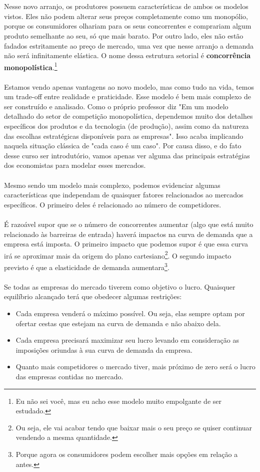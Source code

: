 \documentclass[a4paper,11pt,oneside]{book}
\theoremstyle{definition}
\theoremstyle{break}
\begin{document}
\\
\\
Nesse novo arranjo, os produtores possuem características de ambos os modelos vistos. Eles não podem alterar seus preços completamente como um monopólio, porque os consumidores olhariam para os seus concorrentes e comprariam algum produto semelhante ao seu, só que mais barato. Por outro lado, eles não estão fadados estritamente ao preço de mercado, uma vez que nesse arranjo a demanda não será infinitamente elástica. O nome dessa estrutura setorial é \textbf{concorrência monopolística}.\footnote{Eu não sei você, mas eu acho esse modelo muito empolgante de ser estudado.}
\\
\\
Estamos vendo apenas vantagens ao novo modelo, mas como tudo na vida, temos um trade-off entre realidade e praticidade. Esse modelo é bem mais complexo de ser construído e analisado. Como o próprio professor diz "Em um modelo detalhado do setor de competição monopolística, dependemos muito dos detalhes específicos dos produtos e da tecnologia (de produção), assim como da natureza das escolhas estratégicas disponíveis para as empresas". Isso acaba implicando naquela situação clássica de "cada caso é um caso". Por causa disso, e do fato desse curso ser introdutório, vamos apenas ver alguma das principais estratégias dos economistas para modelar esses mercados.
\\
\\
Mesmo sendo um modelo mais complexo, podemos evidenciar algumas características que independam de quaisquer fatores relacionados ao mercados específicos. O primeiro deles é relacionado ao número de competidores.
\\
\\
É razoável supor que se o número de concorrentes aumentar (algo que está muito relacionado às barreiras de entrada) haverá impactos na curva de demanda que a empresa está imposta. O primeiro impacto que podemos supor é que essa curva irá se aproximar mais da origem do plano cartesiano\footnote{Ou seja, ele vai acabar tendo que baixar mais o seu preço se quiser continuar vendendo a mesma quantidade.}. O segundo impacto previsto é que a elasticidade de demanda aumentara\footnote{Porque agora os consumidores podem escolher mais opções em relação a antes.}.
\\
\\
Se todas as empresas do mercado tiverem como objetivo o lucro. Quaisquer equilíbrio alcançado terá que obedecer algumas restrições:
\begin{itemize}
\item Cada empresa venderá o máximo possível. Ou seja, elas sempre optam por ofertar cestas que estejam na curva de demanda e não abaixo dela.
\item Cada empresa precisará maximizar seu lucro levando em consideração as imposições oriundas à sua curva de demanda da empresa.
\item Quanto mais competidores o mercado tiver, mais próximo de zero será o lucro das empresas contidas no mercado.
\end{itemize}
\end{document}
